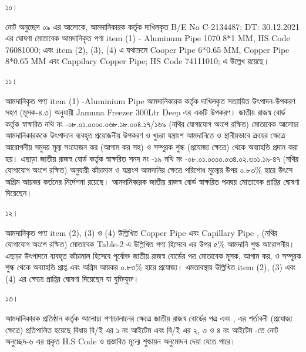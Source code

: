 \documentclass[12pt]{article}
\newcommand{\beno}{C-2134487}
\newcommand{\bedt}{30.12.2021}
\begin{document}
\thispagestyle{empty}
\vspace*{7.0in}
\noindent
\begin{minipage}[t]{0.05\linewidth}
১০।
\end{minipage}
\begin{minipage}[t]{0.95\linewidth}
নোট অনুচ্ছেদ ০৯ এর আলোকে,
আমদানিকারক {\jeal} কর্তৃক
দাখিলকৃত B/E No {\beno}; DT: {\bedt}
এর ঘোষণা মোতাবেক আমদানিকৃত পণ্য
item (1) - Aluminum Pipe 1070 8*1 MM, HS Code 76081000; {\cpcsso} এবং item
(2), (3), (4) এ যথাক্রমে Cooper Pipe 6*0.65 MM, Copper Pipe 8*0.65 MM এবং Cappilary Copper Pipe; HS Code 74111010; {\cpcfzn} এ উল্লেখ রয়েছে।
\\
\end{minipage}
\begin{minipage}[t]{0.05\linewidth}
১১।
\end{minipage}
\begin{minipage}[t]{0.95\linewidth}
আমদানিকৃত পণ্য item (1) -Aluminium Pipe আমদানিকারক কর্তৃক দাখিলকৃত সত্যায়িত উৎপাদন-উপকরণ সহগ (মূসক-৪.৩) অনুযায়ী
Jamuna Freezer 300Ltr Deep এর একটি উপকরণ। জাতীয় রাজস্ব বোর্ড কর্তৃক স্বাক্ষরিত নথি নং -০৮.০১.০০০০.০৬৮.১৮.০০৪.১৭/১৬৯ (নথির যোগাযোগ অংশে রক্ষিত) মোতাবেক আলোচ্য আমদানিকারককে
উৎপাদনে ব্যবহৃত প্রয়োজনীয় উপকরণ ও খুচরা যন্ত্রাংশ আমদানিতে ও স্থানীয়ভাবে ক্রয়ের ক্ষেত্রে আরোপনীয় সমুদয় মূল্য সংযোজন কর (আগাম কর সহ) ও সম্পূরক শুল্ক (প্রযোজ্য ক্ষেত্রে) থেকে অব্যাহতি প্রদান করা হয়।
এছাড়া
জাতীয় রাজস্ব বোর্ড কর্তৃক স্বাক্ষরিত সনদ নং -১৯ নথি নং -০৮.০১.০০০০.০৩৪.০২.৩০১.১৯-৪৭ (নথির যোগাযোগ অংশে রক্ষিত)
অনুযায়ী কাঁচামাল ও যন্ত্রাংশ আমদানির ক্ষেত্রে পরিশোধ মূল্যের উপর ০.৮৩\% হারে উৎসে অগ্রিম আয়কর কর্তনের নির্দেশনা রয়েছে।
আমদানিকারক জাতীয় রাজস্ব বোর্ড স্বাক্ষরিত পত্রদ্বয় মোতাবেক {\cpcsso} প্রাপ্তির ঘোষণা দিয়েছেন।
\\
\end{minipage}
\begin{minipage}[t]{0.05\linewidth}
১২।
\end{minipage}
\begin{minipage}[t]{0.95\linewidth}
আমদানিকৃত পণ্য item (2), (3) ও (4) উল্লিখিত Copper Pipe এবং Capillary Pipe {\srooof}, {\srooofd} (নথির যোগাযোগ অংশে রক্ষিত) মোতাবেক Table-2 এ উল্লিখিত পণ্য হিসেবে এর উপর ৫\% আমদানি শুল্ক আরোপনীয়। এছাড়া উৎপাদনে ব্যবহৃত
কাঁচামাল হিসেবে পূর্বোক্ত জাতীয় রাজস্ব বোর্ডের পত্র মোতাবেক মূসক, আগাম কর, ও সম্পূরক শুল্ক থেকে অব্যাহতি প্রাপ্ত এবং অগ্রিম আয়কর ০.৮৩\% হারে প্রযোজ্য। এমতাবস্থায় উল্লিখিত item (2), (3) এবং (4) এর ক্ষেত্রে {\cpcfzn} প্রাপ্তির ঘোষণা দিয়েছেন যা যুক্তিযুক্ত।
\\
\end{minipage}
\begin{minipage}[t]{0.05\linewidth}
১৩।
\end{minipage}
\begin{minipage}[t]{0.95\linewidth}
আমদানিকারক প্রতিষ্ঠান কর্তৃক
আলোচ্য পণ্যচালানের ক্ষেত্রে
জাতীয় রাজস্ব বোর্ডের পত্র
এবং {\srooof}, {\srooofd}
এর শর্তাবলী (প্রযোজ্য ক্ষেত্রে) প্রতিপালিত হয়েছে
বিধায় 
বি/ই এর ১ নং আইটেম
{\cpcsso}
এবং
বি/ই এর ২, ৩ ও ৪ নং আইটেম
{\cpcfzn} -তে নোট অনুচ্ছেদ-৬ এর প্রকৃত H.S Code
ও প্রস্তাবিত মূল্যে শুল্কায়ন অনুমোদন দেয়া যেতে পারে।
\end{minipage}
\end{document}
